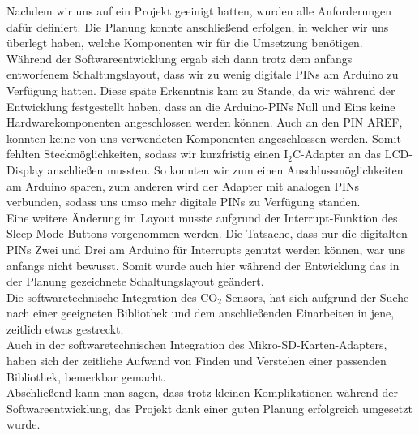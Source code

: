 \label{FazitSW}

Nachdem wir uns auf ein Projekt geeinigt hatten, wurden alle Anforderungen dafür definiert. Die Planung konnte anschließend erfolgen, in welcher wir uns überlegt haben, welche Komponenten wir für die Umsetzung benötigen. \\
Während der Softwareentwicklung ergab sich dann trotz dem anfangs entworfenem Schaltungslayout, dass wir zu wenig digitale PINs am Arduino zu Verfügung hatten. Diese späte Erkenntnis kam zu Stande, da wir während der Entwicklung festgestellt haben, dass an die Arduino-PINs Null und Eins keine Hardwarekomponenten angeschlossen werden können. Auch an den PIN AREF, konnten keine von uns verwendeten Komponenten angeschlossen werden. Somit fehlten Steckmöglichkeiten, sodass wir kurzfristig einen I$_2$C-Adapter an das \ac{LCD}-Display anschließen mussten. So konnten wir zum einen Anschlussmöglichkeiten am Arduino sparen, zum anderen wird der Adapter mit analogen PINs verbunden, sodass uns umso mehr digitale PINs zu Verfügung standen. \\
Eine weitere Änderung im Layout musste aufgrund der Interrupt-Funktion des Sleep-Mode-Buttons vorgenommen werden. Die Tatsache, dass nur die digitalten PINs Zwei und Drei am Arduino für Interrupts genutzt werden können, war uns anfangs nicht bewusst. Somit wurde auch hier während der Entwicklung das in der Planung gezeichnete Schaltungslayout geändert. \\
Die softwaretechnische Integration des CO$_2$-Sensors, hat sich aufgrund der Suche nach einer geeigneten Bibliothek und dem anschließenden Einarbeiten in jene, zeitlich etwas gestreckt. \\
Auch in der softwaretechnischen Integration des Mikro-SD-Karten-Adapters, haben sich der zeitliche Aufwand von Finden und Verstehen einer passenden Bibliothek, bemerkbar gemacht. \\
Abschließend kann man sagen, dass trotz kleinen Komplikationen während der Softwareentwicklung, das Projekt dank einer guten Planung erfolgreich umgesetzt wurde. 